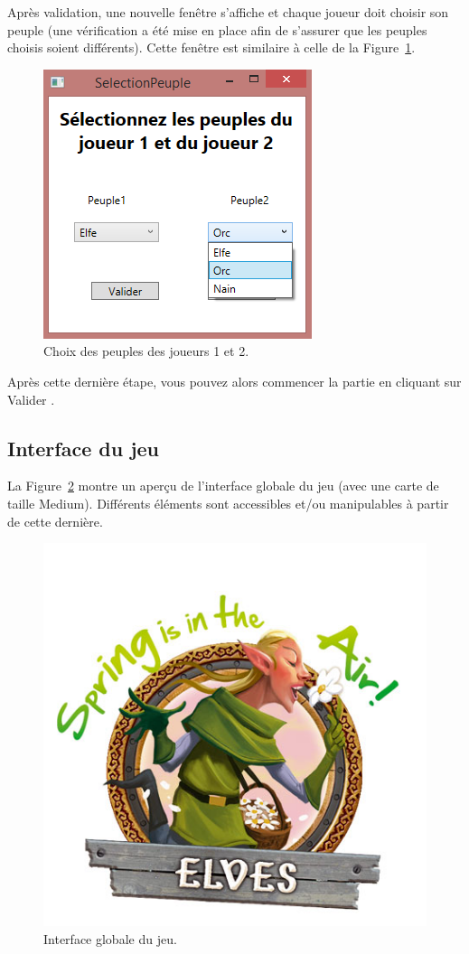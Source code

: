 Après validation, une nouvelle fenêtre s'affiche et chaque joueur doit choisir son peuple (une vérification a été mise en place afin de s'assurer que les peuples choisis soient différents). Cette fenêtre est similaire à celle de la {\sc Figure}~\ref{fig:choicePeoples}.

\begin{figure}
    \centering
    \includegraphics[height=0.60\textwidth]{figure/choicePeoples.png}
    \caption{Choix des peuples des joueurs 1 et 2.}
    \label{fig:choicePeoples}
\end{figure}

Après cette dernière étape, vous pouvez alors commencer la partie en cliquant sur \og Valider \fg{}.

\subsection{Interface du jeu}

La {\sc Figure}~\ref{fig:game} montre un aperçu de l'interface globale du jeu (avec une carte de taille Medium). Différents éléments sont accessibles et/ou manipulables à partir de cette dernière.

\begin{landscape}
            \begin{figure}
                \centering
                \includegraphics[height=0.66\textwidth]{figure/ecranAccueil.png}
                \caption{Interface globale du jeu.}
                \label{fig:game}
            \end{figure}
        \end{landscape}

